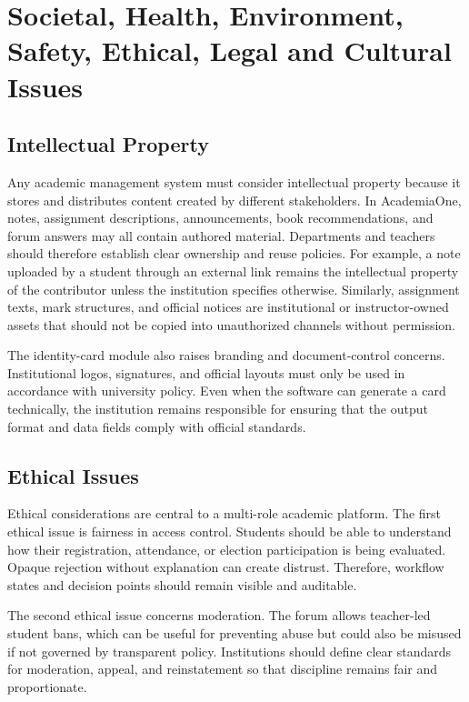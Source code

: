 \documentclass[12pt,a4paper]{report}
\newcommand{\systemName}{AcademiaOne}
\begin{document}
\chapter{Societal, Health, Environment, Safety, Ethical, Legal and Cultural Issues}

\section{Intellectual Property}
Any academic management system must consider intellectual property because it stores and distributes content created by different stakeholders. In \systemName{}, notes, assignment descriptions, announcements, book recommendations, and forum answers may all contain authored material. Departments and teachers should therefore establish clear ownership and reuse policies. For example, a note uploaded by a student through an external link remains the intellectual property of the contributor unless the institution specifies otherwise. Similarly, assignment texts, mark structures, and official notices are institutional or instructor-owned assets that should not be copied into unauthorized channels without permission.

The identity-card module also raises branding and document-control concerns. Institutional logos, signatures, and official layouts must only be used in accordance with university policy. Even when the software can generate a card technically, the institution remains responsible for ensuring that the output format and data fields comply with official standards.

\section{Ethical Issues}
Ethical considerations are central to a multi-role academic platform. The first ethical issue is fairness in access control. Students should be able to understand how their registration, attendance, or election participation is being evaluated. Opaque rejection without explanation can create distrust. Therefore, workflow states and decision points should remain visible and auditable.

The second ethical issue concerns moderation. The forum allows teacher-led student bans, which can be useful for preventing abuse but could also be misused if not governed by transparent policy. Institutions should define clear standards for moderation, appeal, and reinstatement so that discipline remains fair and proportionate.
\end{document}
